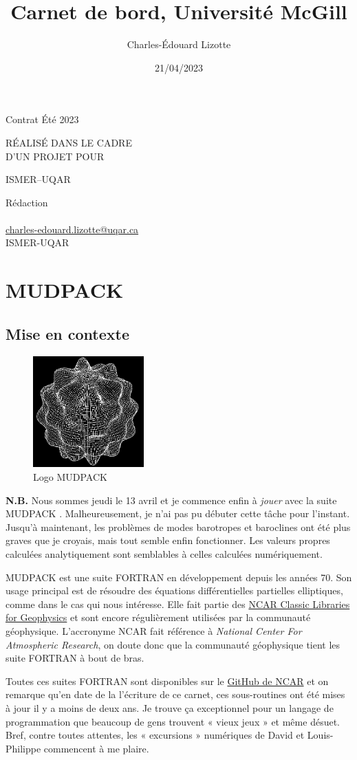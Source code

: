 \documentclass[10pt]{article}
\author{Charles-Édouard Lizotte}
\date{21/04/2023}
\title{Carnet de bord, Université McGill}
\makeatletter
\numberwithin{equation}{section}
\newcommand{\mytitlepage}{
\begin{titlepage}
\begin{center}
{\Large Contrat Été 2023 \par}
\vspace{2cm}
{\Large \MakeUppercase{\thetitle} \par}
\vspace{2cm}
RÉALISÉ DANS LE CADRE\\ D'UN PROJET POUR \par
\vspace{2cm}
{\Large ISMER--UQAR \par}
\vspace{2cm}
{\thedate}
\end{center}
\vfill
Rédaction \\
{\theauthor}\\
\url{charles-edouard.lizotte@uqar.ca}\\
ISMER-UQAR
\end{titlepage}
}
\makeatother
\begin{document}
\mytitlepage
\tableofcontents\newpage


\section{MUDPACK}
\label{sec:org004f0cf}
\subsection{Mise en contexte}
\label{sec:org18cf865}


\begin{figure} \vspace{-\baselineskip}
\centering
\includegraphics[width=0.38\textwidth]{figures/logos/SPHERE.png}
\caption{\label{fig:orga20493b}Logo MUDPACK}
\end{figure}

\textbf{N.B.} Nous sommes jeudi le 13 avril et je commence enfin à \emph{jouer} avec la suite MUDPACK   \citep{adams1989mudpack}.
Malheureusement, je n'ai pas pu débuter cette tâche pour l'instant.
Jusqu'à maintenant, les problèmes de modes barotropes et baroclines ont été plus graves que je croyais, mais tout semble enfin fonctionner.
Les valeurs propres calculées analytiquement sont semblables à celles calculées numériquement. \bigskip

MUDPACK \citep{adams1989mudpack} est une suite FORTRAN en développement depuis les années 70.
Son usage principal est de résoudre des équations différentielles partielles elliptiques, comme dans le cas qui nous intéresse.
Elle fait partie des \href{https://arc.ucar.edu/knowledge\_base/71991310}{NCAR Classic Libraries for Geophysics} et sont encore régulièrement utilisées par la communauté géophysique.
L'accronyme NCAR fait référence à \emph{National Center For Atmospheric Research}, on doute donc que la communauté géophysique tient les suite FORTRAN à bout de bras.\bigskip

Toutes ces suites FORTRAN sont disponibles sur le \href{https://github.com/NCAR/NCAR-Classic-Libraries-for-Geophysics}{GitHub de NCAR} et on remarque qu'en date de la l'écriture de ce carnet, ces sous-routines ont été mises à jour il y a moins de deux ans.
Je trouve ça exceptionnel pour un langage de programmation que beaucoup de gens trouvent « vieux jeux » et même désuet.
Bref, contre toutes attentes, les « excursions » numériques de David et Louis-Philippe commencent à me plaire.
\end{document}
